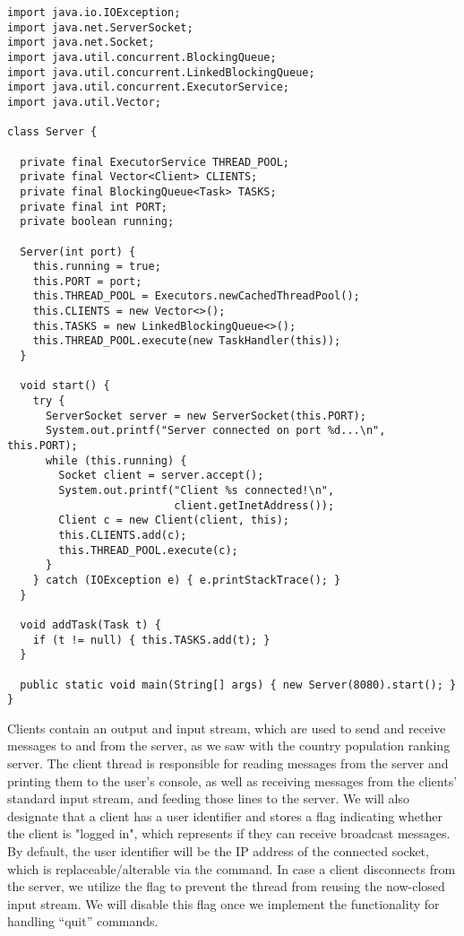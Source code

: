 \begin{lstlisting}[language=MyJava]
import java.io.IOException;
import java.net.ServerSocket;
import java.net.Socket;
import java.util.concurrent.BlockingQueue;
import java.util.concurrent.LinkedBlockingQueue;
import java.util.concurrent.ExecutorService;
import java.util.Vector;

class Server {

  private final ExecutorService THREAD_POOL;
  private final Vector<Client> CLIENTS;
  private final BlockingQueue<Task> TASKS;
  private final int PORT;
  private boolean running;

  Server(int port) {
    this.running = true;
    this.PORT = port;
    this.THREAD_POOL = Executors.newCachedThreadPool();
    this.CLIENTS = new Vector<>();
    this.TASKS = new LinkedBlockingQueue<>();
    this.THREAD_POOL.execute(new TaskHandler(this));
  }

  void start() {
    try {
      ServerSocket server = new ServerSocket(this.PORT);
      System.out.printf("Server connected on port %d...\n", this.PORT);
      while (this.running) {
        Socket client = server.accept();
        System.out.printf("Client %s connected!\n", 
                          client.getInetAddress());
        Client c = new Client(client, this);
        this.CLIENTS.add(c);
        this.THREAD_POOL.execute(c);
      }
    } catch (IOException e) { e.printStackTrace(); }
  }

  void addTask(Task t) {
    if (t != null) { this.TASKS.add(t); }
  }

  public static void main(String[] args) { new Server(8080).start(); }
}
\end{lstlisting}

Clients contain an output and input stream, which are used to send and receive messages to and from the server, as we saw with the country population ranking server. 
The client thread is responsible for reading messages from the server and printing them to the user's console, as well as receiving messages from the clients' standard input stream, and feeding those lines to the server. 
We will also designate that a client has a user identifier and stores a flag indicating whether the client is "logged in", which represents if they can receive broadcast messages. 
By default, the user identifier will be the IP address of the connected socket, which is replaceable/alterable via the  command. 
In case a client disconnects from the server, we utilize the  flag to prevent the thread from reusing the now-closed input stream. 
We will disable this flag once we implement the functionality for handling ``quit'' commands.

